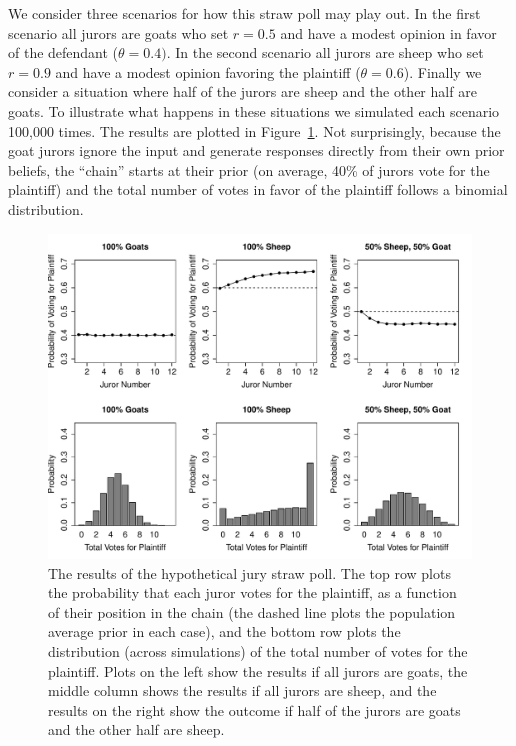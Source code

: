 \documentclass[doc]{apa6}
\begin{document}
We consider three scenarios for how this straw poll may play out. In the first scenario all jurors are {\sc goats} who set $r=0.5$ and have a modest opinion in favor of the defendant ($\theta = 0.4)$. In the second scenario all jurors are {\sc sheep} who set $r=0.9$ and have a modest opinion favoring the plaintiff ($\theta = 0.6$). Finally we consider a situation where half of the jurors are {\sc sheep} and the other half are {\sc goats}. To illustrate what happens in these situations we simulated each scenario 100,000 times. The results are plotted in Figure~\ref{juror}. Not surprisingly, because the {\sc goat} jurors ignore the input and generate responses directly from their own prior beliefs, the ``chain'' starts at their prior (on average, 40\% of jurors vote for the plaintiff) and the total number of votes in favor of the plaintiff follows a binomial distribution.


\begin{figure}[t]
\begin{center}
\includegraphics[width=14cm]{juror1.pdf} %
\caption{{\small The results of the hypothetical jury straw poll. The top row plots the probability that each juror votes for the plaintiff, as a function of their position in the chain (the dashed line plots the population average prior in each case), and the bottom row plots the distribution (across simulations) of the total number of votes for the plaintiff. Plots on the left show the results if all jurors are {\sc goats}, the middle column shows the results if all jurors are {\sc sheep}, and the results on the right show the outcome if half of the jurors are {\sc goats} and the other half are {\sc sheep}.}}
\label{juror}
\end{center}
\end{figure}
\end{document}

